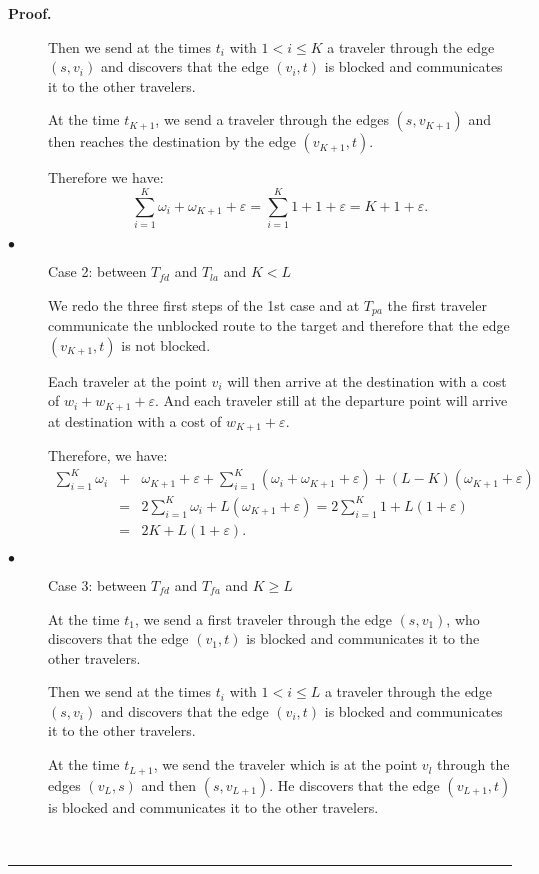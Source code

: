 \documentclass[letter-size, 11pt]{article}
\newenvironment{proof}[1][Proof]{\textbf{#1.} }{\ \rule{0.5em}{0.5em}}
\begin{document}
\begin{proof}
\begin{description}
Then we send at the times $t_i$ with $1 < i \leq K$ a traveler through the edge $(s,v_i)$ and discovers that the edge $(v_i,t)$ is blocked and communicates it to the other travelers.

At the time $t_{K+1}$, we send a traveler through the edges $(s,v_{K+1})$ and then reaches the destination by the edge $(v_{K+1},t)$. 

Therefore we have: 
\[
\sum_{i=1}^{K} \omega_{i} + \omega_{K+1} + \varepsilon = \sum_{i=1}^{K} 1 + 1 + \varepsilon = K + 1 + \varepsilon.
\]

\item[$\bullet$] Case 2: between $T_{fd}$ and $T_{la}$ and $K<L$

We redo the three first steps of the 1st case and at $ T_{pa} $ the first traveler communicate the unblocked route to the target and therefore that the edge $(v_{K+1},t)$ is not blocked.


Each traveler at the point $v_i$ will then arrive at the destination with a cost of $w_i + w_{K+1} + \varepsilon$. And each traveler still at the departure point will arrive at destination with a cost of $w_{K+1} + \varepsilon$.

Therefore, we have:
\begin{eqnarray}
\sum_{i=1}^{K} \omega_{i} &+& \omega_{K+1} + \varepsilon + \sum_{i=1}^{K}(\omega_{i} + \omega_{K+1} + \varepsilon) + (L - K) ( \omega_{K+1} + \varepsilon ) \nonumber \\
&=& 2\sum_{i=1}^{K} \omega_{i} + L(\omega_{K+1} + \varepsilon ) = 2\sum_{i=1}^{K} 1+ L(1 + \varepsilon ) \nonumber \\
&=& 2K+ L(1 + \varepsilon ). \nonumber
\end{eqnarray}


\item[$\bullet$] Case 3: between $T_{fd}$ and $T_{fa}$ and $K \geq L$

At the time $t_1$, we send a first traveler through the edge $(s,v_1)$, who discovers that the edge $(v_1,t)$ is blocked and communicates it to the other travelers.

Then we send at the times $t_i$ with $1 < i \leq L$ a traveler through the edge $(s,v_i)$ and discovers that the edge $(v_i,t)$ is blocked and communicates it to the other travelers.

At the time $t_{L+1}$, we send the traveler which is at the point $v_l$ through the edges $(v_{L},s)$ and then $(s,v_{L+1})$. He discovers that the edge $(v_{L+1},t)$ is blocked and communicates it to the other travelers.


\end{description}
\end{proof}
\end{document}
